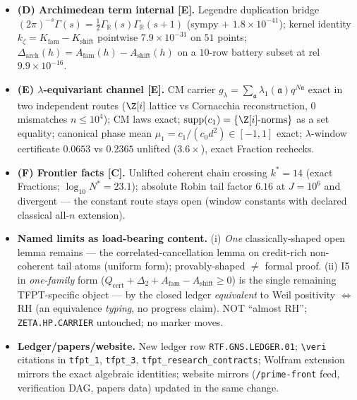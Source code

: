 \documentclass[11pt]{article}
\providecommand{\mE}{\textbf{[E]}}\providecommand{\mC}{\textbf{[C]}}
\begin{document}
\begin{itemize}[leftmargin=1.5em]
confinement \emph{set equality} on $10^6$: zero-credit clash atoms $=$ $\chi_{-4}$-coherent
odd composites.
\item \textbf{(D) Archimedean term internal \mE.} Legendre duplication bridge
$(2\pi)^{-s}\Gamma(s)=\tfrac12\Gamma_{\mathbb R}(s)\Gamma_{\mathbb R}(s{+}1)$ (sympy $+$
$1.8\times10^{-41}$); kernel identity $k_\zeta=K_{\mathrm{fam}}-K_{\mathrm{shift}}$ pointwise
$7.9\times10^{-31}$ on $51$ points; $\Delta_{\mathrm{arch}}(h)=A_{\mathrm{fam}}(h)-A_{\mathrm{shift}}(h)$
on a $10$-row battery subset at rel $9.9\times10^{-16}$.
\item \textbf{(E) $\lambda$-equivariant channel \mE.} CM carrier
$g_\lambda=\sum_{\mathfrak a}\lambda_1(\mathfrak a)q^{N\mathfrak a}$ exact in two independent
routes ($\Z[i]$ lattice vs Cornacchia reconstruction, $0$ mismatches $n\le10^4$); CM laws exact;
$\operatorname{supp}(c_1)=\{\Z[i]\text{-norms}\}$ as a set equality; canonical phase mean
$\mu_1=c_1/(c_0d^2)\in[-1,1]$ exact; $\lambda$-window certificate $0.0653$ vs $0.2365$ unlifted
($3.6\times$), exact Fraction rechecks.
\item \textbf{(F) Frontier facts \mC.} Unlifted coherent chain crossing $k^*=14$ (exact
Fractions; $\log_{10}N^*=23.1$); absolute Robin tail factor $6.16$ at $J=10^6$ and divergent ---
the constant route stays open (window constants with declared classical all-$n$ extension).
\item \textbf{Named limits as load-bearing content.} (i) \emph{One} classically-shaped open
lemma remains --- the correlated-cancellation lemma on credit-rich non-coherent tail atoms
(uniform form); provably-shaped $\neq$ formal proof. (ii) I5 in \emph{one-family} form
($Q_{\mathrm{cert}}+\Delta_2+A_{\mathrm{fam}}-A_{\mathrm{shift}}\ge0$) is the single remaining
TFPT-specific object --- by the closed ledger \emph{equivalent} to Weil positivity
$\Longleftrightarrow$ RH (an equivalence \emph{typing}, no progress claim). NOT ``almost RH'';
\texttt{ZETA.HP.CARRIER} untouched; no marker moves.
\item \textbf{Ledger/papers/website.} New ledger row \texttt{RTF.GNS.LEDGER.01};
\texttt{\textbackslash veri} citations in \texttt{tfpt\_1}, \texttt{tfpt\_3},
\texttt{tfpt\_research\_contracts}; Wolfram extension mirrors the exact algebraic identities;
website mirrors (\texttt{/prime-front} feed, verification DAG, papers data) updated in the
same change.
\end{itemize}
\end{document}
